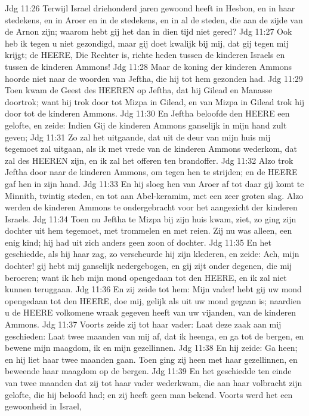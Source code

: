 Jdg 11:26  Terwijl Israel driehonderd jaren gewoond heeft in Hesbon, en in haar stedekens, en in Aroer en in de stedekens, en in al de steden, die aan de zijde van de Arnon zijn; waarom hebt gij het dan in dien tijd niet gered?
Jdg 11:27  Ook heb ik tegen u niet gezondigd, maar gij doet kwalijk bij mij, dat gij tegen mij krijgt; de HEERE, Die Rechter is, richte heden tussen de kinderen Israels en tussen de kinderen Ammons!
Jdg 11:28  Maar de koning der kinderen Ammons hoorde niet naar de woorden van Jeftha, die hij tot hem gezonden had.
Jdg 11:29  Toen kwam de Geest des HEEREN op Jeftha, dat hij Gilead en Manasse doortrok; want hij trok door tot Mizpa in Gilead, en van Mizpa in Gilead trok hij door tot de kinderen Ammons.
Jdg 11:30  En Jeftha beloofde den HEERE een gelofte, en zeide: Indien Gij de kinderen Ammons ganselijk in mijn hand zult geven;
Jdg 11:31  Zo zal het uitgaande, dat uit de deur van mijn huis mij tegemoet zal uitgaan, als ik met vrede van de kinderen Ammons wederkom, dat zal des HEEREN zijn, en ik zal het offeren ten brandoffer.
Jdg 11:32  Alzo trok Jeftha door naar de kinderen Ammons, om tegen hen te strijden; en de HEERE gaf hen in zijn hand.
Jdg 11:33  En hij sloeg hen van Aroer af tot daar gij komt te Minnith, twintig steden, en tot aan Abel-keramim, met een zeer groten slag. Alzo werden de kinderen Ammons te ondergebracht voor het aangezicht der kinderen Israels.
Jdg 11:34  Toen nu Jeftha te Mizpa bij zijn huis kwam, ziet, zo ging zijn dochter uit hem tegemoet, met trommelen en met reien. Zij nu was alleen, een enig kind; hij had uit zich anders geen zoon of dochter.
Jdg 11:35  En het geschiedde, als hij haar zag, zo verscheurde hij zijn klederen, en zeide: Ach, mijn dochter! gij hebt mij ganselijk nedergebogen, en gij zijt onder degenen, die mij beroeren; want ik heb mijn mond opengedaan tot den HEERE, en ik zal niet kunnen teruggaan.
Jdg 11:36  En zij zeide tot hem: Mijn vader! hebt gij uw mond opengedaan tot den HEERE, doe mij, gelijk als uit uw mond gegaan is; naardien u de HEERE volkomene wraak gegeven heeft van uw vijanden, van de kinderen Ammons.
Jdg 11:37  Voorts zeide zij tot haar vader: Laat deze zaak aan mij geschieden: Laat twee maanden van mij af, dat ik heenga, en ga tot de bergen, en bewene mijn maagdom, ik en mijn gezellinnen.
Jdg 11:38  En hij zeide: Ga heen; en hij liet haar twee maanden gaan. Toen ging zij heen met haar gezellinnen, en beweende haar maagdom op de bergen.
Jdg 11:39  En het geschiedde ten einde van twee maanden dat zij tot haar vader wederkwam, die aan haar volbracht zijn gelofte, die hij beloofd had; en zij heeft geen man bekend. Voorts werd het een gewoonheid in Israel,
